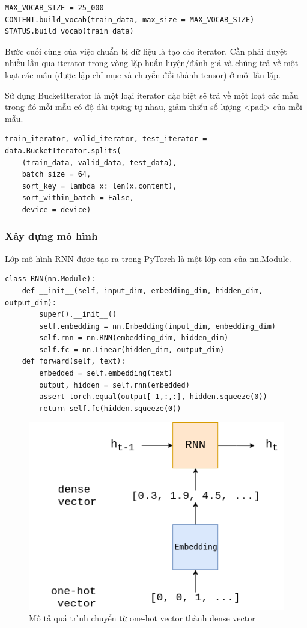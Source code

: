 \documentclass[runningheads]{llncs}
\begin{document}
\begin{lstlisting}
MAX_VOCAB_SIZE = 25_000
CONTENT.build_vocab(train_data, max_size = MAX_VOCAB_SIZE)
STATUS.build_vocab(train_data)
\end{lstlisting}

Bước cuối cùng của việc chuẩn bị dữ liệu là tạo các iterator. Cần phải duyệt nhiều lần qua iterator trong vòng lặp huấn luyện/đánh giá và chúng trả về một loạt các mẫu (được lập chỉ mục và chuyển đổi thành tensor) ở mỗi lần lặp.

Sử dụng BucketIterator là một loại iterator đặc biệt sẽ trả về một loạt các mẫu trong đó mỗi mẫu có độ dài tương tự nhau, giảm thiểu số lượng <pad> của mỗi mẫu.

\begin{lstlisting}
train_iterator, valid_iterator, test_iterator = data.BucketIterator.splits(
    (train_data, valid_data, test_data), 
    batch_size = 64,
    sort_key = lambda x: len(x.content),
    sort_within_batch = False,
    device = device)
\end{lstlisting}

\subsubsection{Xây dựng mô hình}

Lớp mô hình RNN được tạo ra trong PyTorch là một lớp con của nn.Module. 

\begin{lstlisting}
class RNN(nn.Module):
    def __init__(self, input_dim, embedding_dim, hidden_dim, output_dim):        
        super().__init__()        
        self.embedding = nn.Embedding(input_dim, embedding_dim)        
        self.rnn = nn.RNN(embedding_dim, hidden_dim)        
        self.fc = nn.Linear(hidden_dim, output_dim)        
    def forward(self, text):        
        embedded = self.embedding(text)        
        output, hidden = self.rnn(embedded)
        assert torch.equal(output[-1,:,:], hidden.squeeze(0))        
        return self.fc(hidden.squeeze(0))
\end{lstlisting}

\begin{figure}
\includegraphics[scale=0.5]{sentiment7.png}
\centering
\caption{Mô tả quá trình chuyển từ one-hot vector thành dense vector \label{figOnehotToDense}}
\end{figure}
\end{document}
